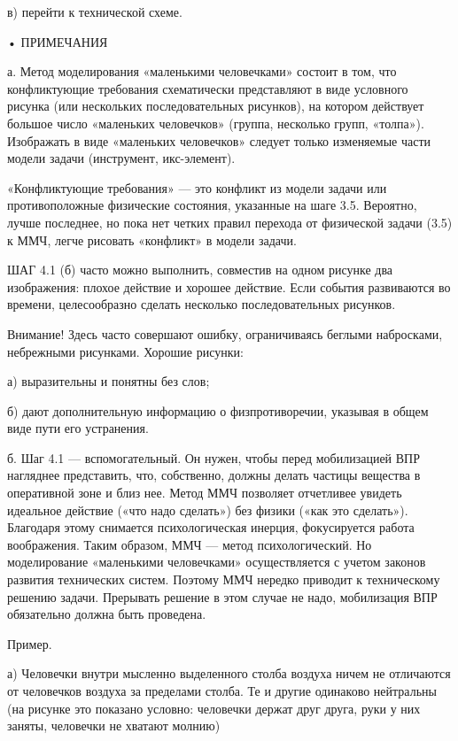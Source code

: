 в) перейти к технической схеме.

• ПРИМЕЧАНИЯ

а.  Метод моделирования  «маленькими человечками»  состоит в  том, что
конфликтующие  требования схематически  представляют в  виде условного
рисунка  (или   нескольких  последовательных  рисунков),   на  котором
действует  большое  число  «маленьких человечков»  (группа,  несколько
групп,  «толпа»). Изображать  в  виде  «маленьких человечков»  следует
только изменяемые части модели задачи (инструмент, икс-элемент).

«Конфликтующие  требования»  —  это  конфликт  из  модели  задачи  или
противоположные физические состояния, указанные на шаге 3.5. Вероятно,
лучше  последнее, но  пока нет  четких правил  перехода от  физической
задачи (3.5) к ММЧ, легче рисовать «конфликт» в модели задачи.

ШАГ  4.1  (б)  часто  можно  выполнить,  совместив  на  одном  рисунке
два   изображения:   плохое   действие  и   хорошее   действие.   Если
события  развиваются  во   времени,  целесообразно  сделать  несколько
последовательных рисунков.


Внимание!   Здесь  часто   совершают  ошибку,   ограничиваясь  беглыми
набросками, небрежными рисунками. Хорошие рисунки:

а) выразительны и понятны без слов;

б) дают дополнительную информацию  о физпротиворечии, указывая в общем
виде пути его устранения.

б.  Шаг 4.1  —  вспомогательный. Он  нужен,  чтобы перед  мобилизацией
ВПР  нагляднее представить,  что,  собственно,  должны делать  частицы
вещества  в  оперативной   зоне  и  близ  нее.   Метод  ММЧ  позволяет
отчетливее  увидеть  идеальное  действие   («что  надо  сделать»)  без
физики («как это сделать»).  Благодаря этому снимается психологическая
инерция,  фокусируется  работа  воображения.   Таким  образом,  ММЧ  —
метод  психологический.  Но   моделирование  «маленькими  человечками»
осуществляется с  учетом законов развития технических  систем. Поэтому
ММЧ нередко приводит к  техническому решению задачи. Прерывать решение
в  этом  случае  не  надо, мобилизация  ВПР  обязательно  должна  быть
проведена.

Пример.

а)  Человечки  внутри мысленно  выделенного  столба  воздуха ничем  не
отличаются  от человечков  воздуха за  пределами столба.  Те и  другие
одинаково  нейтральны  (на  рисунке это  показано  условно:  человечки
держат друг друга, руки у них заняты, человечки не хватают молнию)

